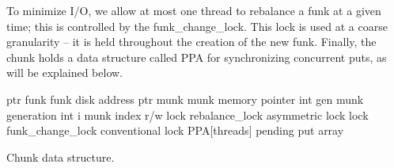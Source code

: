 To minimize I/O, we allow at most one thread to rebalance a funk at a given time; this is controlled by 
the  funk\_change\_lock. This lock is used at a coarse granularity -- it is held throughout the creation of the new funk. 
Finally, the chunk holds a data structure called PPA for synchronizing concurrent puts, as will be explained below. 


\begin{algorithm}[htb]
\begin{algorithmic}
\State ptr funk \Comment funk disk address
\State ptr munk \Comment munk memory pointer
\State int gen \Comment munk generation
\State int i \Comment munk index
\State r/w lock rebalance\_lock \Comment asymmetric  lock 
\State lock funk\_change\_lock \Comment conventional lock 
\State PPA[threads] \Comment pending put array
\end{algorithmic}
\caption{Chunk data structure.}
\label{alg:chunk}
\end{algorithm}








